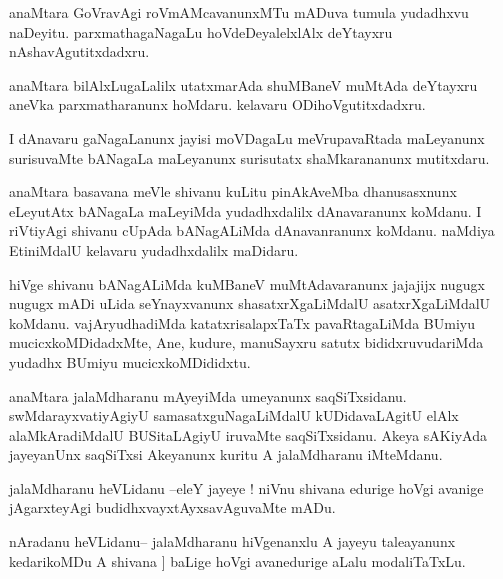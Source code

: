 \documentclass{article}
\begin{document}
\begin{mn}%
anaMtara GoVravAgi roVmAMcavanunxMTu mADuva tumula yudadhxvu naDeyitu. parxmathagaNagaLu 
hoVdeDeyalelxlAlx deYtayxru nAshavAgutitxdadxru.
\end{mn}

\begin{mn}%
anaMtara bilAlxLugaLalilx utatxmarAda shuMBaneV muMtAda deYtayxru aneVka parxmatharanunx 
hoMdaru. kelavaru ODihoVgutitxdadxru.
\end{mn}

\begin{mn}%
I dAnavaru gaNagaLanunx jayisi moVDagaLu meVrupavaRtada maLeyanunx surisuvaMte bANagaLa 
maLeyanunx surisutatx shaMkarananunx mutitxdaru.
\end{mn}

\begin{mn}%
anaMtara basavana meVle shivanu kuLitu pinAkAveMba dhanusasxnunx eLeyutAtx bANagaLa 
maLeyiMda yudadhxdalilx dAnavaranunx koMdanu. I riVtiyAgi shivanu cUpAda bANagALiMda 
dAnavanranunx koMdanu. naMdiya EtiniMdalU kelavaru yudadhxdalilx maDidaru.
\end{mn}

\begin{mn}%
hiVge shivanu bANagALiMda kuMBaneV muMtAdavaranunx jajajijx nugugx nugugx mADi uLida 
seYnayxvanunx shasatxrXgaLiMdalU asatxrXgaLiMdalU koMdanu. vajAryudhadiMda 
katatxrisalapxTaTx pavaRtagaLiMda BUmiyu mucicxkoMDidadxMte, Ane, kudure, manuSayxru satutx 
bididxruvudariMda yudadhx BUmiyu mucicxkoMDididxtu.
\end{mn}

\begin{mn}%
anaMtara jalaMdharanu mAyeyiMda umeyanunx saqSiTxsidanu. swMdarayxvatiyAgiyU 
samasatxguNagaLiMdalU kUDidavaLAgitU elAlx alaMkAradiMdalU BUSitaLAgiyU iruvaMte 
saqSiTxsidanu. Akeya sAKiyAda jayeyanUnx saqSiTxsi Akeyanunx kuritu A jalaMdharanu iMteMdanu.
\end{mn}

\begin{mn}%
jalaMdharanu heVLidanu --eleY jayeye ! niVnu shivana edurige hoVgi avanige jAgarxteyAgi 
budidhxvayxtAyxsavAguvaMte mADu.
\end{mn}

\begin{mn}%
nAradanu heVLidanu-- jalaMdharanu hiVgenanxlu A jayeyu taleayanunx kedarikoMDu A shivana ]
baLige hoVgi avanedurige aLalu modaliTaTxLu.
\end{mn}
\end{document}
